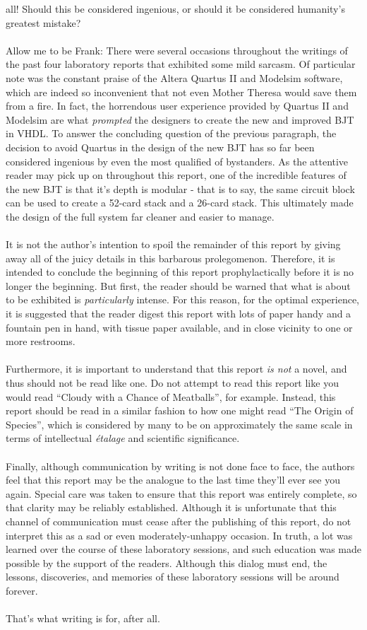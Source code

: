 \documentclass[12pt]{report}
\begin{document}
all! Should this be considered ingenious, or should it be considered humanity's greatest
mistake?\\\\
Allow me to be Frank: There were several occasions throughout the writings of the past four
laboratory reports that exhibited some mild sarcasm. Of particular note was the constant praise of
the Altera Quartus II and Modelsim software, which are indeed so inconvenient that not even
Mother Theresa would save them from a fire. In fact, the horrendous user experience provided by
Quartus II and Modelsim are what \textit{prompted} the designers to create the new and improved BJT
in VHDL. To answer the concluding question of the previous paragraph, the decision to avoid Quartus
in the design of the new BJT has so far been considered ingenious by even the most qualified of
bystanders. As the attentive reader may pick up on throughout this report, one of the incredible
features of the new BJT is that it's depth is modular - that is to say, the same circuit block can
be used to create a 52-card stack and a 26-card stack. This ultimately made the design of the full
system far cleaner and easier to manage.\\\\
It is not the author's intention to spoil the remainder of this report by giving away all of the
juicy details in this barbarous prolegomenon. Therefore, it is intended to conclude the beginning of
this report prophylactically before it is no longer the beginning. But first, the reader should be
warned that what
is about to be exhibited is \textit{particularly} intense. For this reason, for the optimal experience,
it is suggested that the reader digest this report with lots of paper handy and a fountain pen in
hand, with tissue paper available, and in close vicinity to one or more restrooms. \\\\
Furthermore, it
is important to understand that this report \textit{is not} a novel, and thus should not be read
like one. Do not attempt to read this report like you would read ``Cloudy with a Chance of
Meatballs'', for example. Instead, this report should be read in a similar fashion to how one might
read ``The Origin of Species'', which is considered by many to be on approximately the same scale in
terms of intellectual \textit{étalage} and scientific significance.\\\\
Finally, although communication by writing is not done face to face, the authors feel that this
report may be the analogue to the last time they'll ever see you again. Special care was taken to
ensure that this report was entirely complete, so that clarity may be reliably established.
Although it is unfortunate that this channel of communication must cease after the publishing of
this report, do not interpret this as a sad or even moderately-unhappy occasion. In truth, a lot was
learned over the course of these laboratory sessions, and such education was made possible by the
support of the readers. Although this dialog must end, the lessons, discoveries, and memories of
these laboratory sessions will be around forever. \\\\That's what writing is for, after all. 
\end{document}
